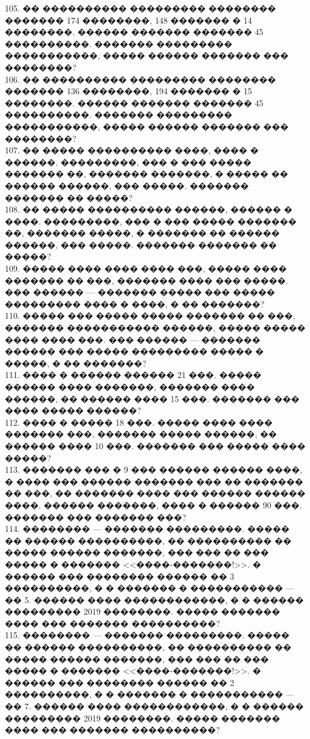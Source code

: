 \documentclass[12pt]{article}
\begin{document}
105. �� ���������� ��������� �������� ������� 174 ��������, 148 ������� � 14 ��������. ������ ������� ������� 45 ����������. ������� ��������� �����������, ����� ������ ������� ��� ��������?\\
106. �� ���������� ��������� �������� ������� 136 ��������, 194 ������� � 15 ��������. ������ ������� ������� 45 ����������. ������� ��������� �����������, ����� ������ ������� ��� ��������?\\
107. �� ����� ���������� ����, ���� � ������. ���������, ��� � ��� ����� ������� ��, ������� �������, � ����� �� ������ ������, ��� �����. ������� ������� �� �����?\\
108. �� ����� ���������� ������, ������ � ����. ���������, ��� � ��� ����� ������� ��, ������� �����, � ������� �� ������ ������, ��� �����. ������� ������� �� �����?\\
109. ����� ���� ���� ���� ���, ����� ���� ������� �� ���, ������� ���� ��� �����. ��� ������ --- ������� ����� ��� ����� ��������� ���� � ����, � �� �������?\\
110. ����� ��� ����� ����� ������� �� ���, ������� ����������� ������, ����� ����� ���� ���� ���. ��� ������ --- ������� ������ ��� ����� ��������� ����� � �����, � �� �������?\\
111. ���� � ������ ������ 21 ���. ����� ������ ���� �������, ������� ���� ������, �� ������ ���� 15 ���. ������� ��� ���� ����� ������?\\
112. ���� � ����� 18 ���. ����� ���� ���� ������� ���, ������� ����� ������, �� ������ ���� 10 ���. ������� ��� ����� ���� �����?\\
113. ������� ��� � 9 ��� ������ ������ ����, � ���� ��� ������ ������� ��� �� ������� �� ���, �� ������� ���� ��� ������ ������ ����. ������ �������, ���� � ������ 90 ���. ������� ��� ������� ���?\\
114. �������� --- ������� ���������. ����� �� ������ ����������, �� ���������� �� ����� ������ �������, ��� ��� �� ��� ����� � ������� <<����-�������!>>. � ������ ��� �������� ������ �� 3 ����������, � � ������� � ����������� --- �� 5. ������ ���� ������������, � � ������ ��������� 2019
��������. ����� ������� ���� ��� ������� ����������?\\
115. �������� --- ������� ���������. ����� �� ������ ����������, �� ���������� �� ����� ������ �������, ��� ��� �� ��� ����� � ������� <<����-�������!>>. � ������ ��� �������� ������ �� 2 ����������, � � ������� � ����������� --- �� 7. ������ ���� ������������, � � ������ ��������� 2019
��������. ����� ������� ���� ��� ������� ����������?\\
\end{document}
